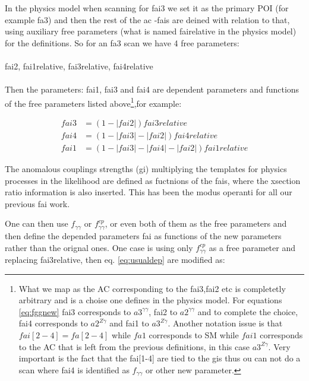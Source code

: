 \documentclass[10pt,a4paper]{article}
\begin{document}
In the physics model when scanning for fai3 we set it as the primary POI (for example fa3) and then the rest of the ac -fais are deined with relation to that, using auxiliary free parameters (what is named fai\textunderscore relative in the physics model) for the definitions. 
So for an fa3 scan we have 4 free parameters: 
\\
\\
fai2, fai1relative, fai3relative, fai4relative
\\
\\
Then the parameters: fai1, fai3 and fai4 
are dependent parameters and functions of the free parameters listed above\footnote{What we map as the AC corresponding to the fai3,fai2 etc is completetly arbitrary and is a choise one defines in the physics model. For equations \ref{eq:fggnew} fai3 corresponds to $a3^{\gamma\gamma}$, fai2 to $a2^{\gamma\gamma}$ and to complete the choice, fai4  corresponds to $a2^{Z\gamma}$ and fai1 to $a3^{Z\gamma}$. Another notation issue is that $fai[2-4]=fa[2-4]$ while $fa1$ corresponds to SM while $fai1$ corresponds to the AC that is left from the previous definitions, in this case $a3^{Z\gamma}$. Very important is the fact that the fai[1-4] are tied to the gis thus ou can not do a scan where fai4 is identified as $f_{\gamma\gamma}$ or other new parameter.},for example: 

\begin{equation}\label{eq:usualdep}
\begin{align}
fai3 &= (1-|fai2|)fai3relative\\
fai4 &= (1-|fai3| -|fai2| )fai4relative\\
fai1 &= (1-|fai3| -|fai4| - |fai2| )fai1relative
\end{align}
\end{equation}
 
  
  
The anomalous couplings strengths (gi) multiplying the templates for physics processes in the likelihood are defined as fuctnions of the fais, where the xsection ratio information is also inserted. This has been the modus operanti for all our previous fai work. 


One can then use $f_{\gamma\gamma}$ or $f_{\gamma\gamma}^{cp}$, or even both of them as the free parameters and then define the depended parameters fai as functions of the new parameters rather than the orignal ones. 
One case is using only  $f_{\gamma\gamma}^{cp}$ as a free parameter and replacing fai3relative, then eq. \ref{eq:usualdep} are modified as:  
\end{document}
